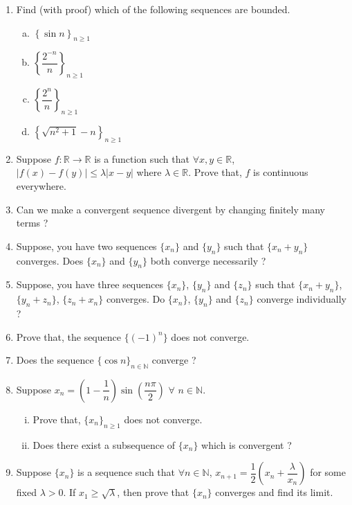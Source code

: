 \documentclass[11pt, a4paper]{article}
\begin{document}
\begin{enumerate}
	\item Find (with proof) which of the following sequences are bounded.
	\begin{enumerate}[(a)]
	\item $\left\{ \sin n \right\}_{n \geq 1}$
	\item $\left\{ \dfrac{2^{-n}}{n} \right\}_{n \geq 1}$
	\item $\left\{ \dfrac{2^{n}}{n} \right\}_{n \geq 1}$
	\item $\left\{ \sqrt{n^2 + 1} - n \right\}_{n \geq 1}$
	\end{enumerate}
	
	\item Suppose $f : \mathbb{R} \rightarrow \mathbb{R}$ is a function such that $\forall x, y \in \mathbb{R}$, $|f(x) - f(y)| \leq \lambda |x-y|$ where $\lambda \in \mathbb{R}$. Prove that, $f$ is continuous everywhere.
	
	\item Can we make a convergent sequence divergent by changing finitely many terms ?
	
	\item Suppose, you have two sequences $\{x_n\}$ and $\{y_n\}$ such that $\{x_n + y_n\}$ converges. Does $\{x_n\}$ and $\{y_n\}$ both converge necessarily ?
	
	\item Suppose, you have three sequences $\{x_n\}$, $\{y_n\}$ and $\{z_n\}$ such that $\{x_n + y_n\}$, $\{y_n + z_n\}$, $\{z_n + x_n\}$ converges. Do $\{x_n\}$, $\{y_n\}$ and $\{z_n\}$ converge individually ?
	
	\item Prove that, the sequence $\{(-1)^n\}$ does not converge.

	\item Does the sequence $\{\cos n\}_{n \in \mathbb{N}}$ converge ?
	
	\item Suppose $x_n = \left( 1 - \dfrac{1}{n} \right) \sin \left(\dfrac{n\pi}{2} \right)$ $\forall$ $n \in \mathbb{N}$. 
	\begin{enumerate}[(i)]
	\item Prove that, $\{x_n\}_{n \geq 1}$ does not converge.
	\item Does there exist a subsequence of $\{x_n\}$ which is convergent ?	
	\end{enumerate}
	
	\item Suppose $\{x_n\}$ is a sequence such that $\forall n \in \mathbb{N}$, $x_{n+1} = \dfrac{1}{2}\left(x_n + \dfrac{\lambda}{x_n}\right)$ for some fixed $\lambda > 0$. If $x_1 \geq \sqrt{\lambda}$, then prove that $\{x_n\}$ converges and find its limit.
	

\end{enumerate}
\end{document}
